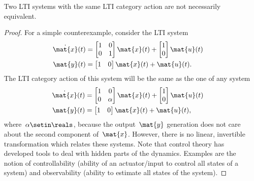 \begin{remark}
    Two LTI systems with the same LTI category action are not necessarily equivalent.
\end{remark}
\begin{proof}
    For a simple counterexample, consider the LTI system
    \begin{equation}
        \begin{aligned}
            \dot{\mat{x}}(t) & =\begin{bmatrix}
                                    1 & 0 \\ 0& 1
                                \end{bmatrix} \mat{x}(t)+\begin{bmatrix}
                                                             1 \\ 0
                                                         \end{bmatrix} \mat{u}(t) \\
            \mat{y}(t)       & =\begin{bmatrix}
                                    1 & 0
                                \end{bmatrix} \mat{x}(t)+\mat{u}(t).
        \end{aligned}
    \end{equation}
    The LTI category action of this system will be the same as the one of any system
    \begin{equation}
        \begin{aligned}
            \dot{\mat{x}}(t) & =\begin{bmatrix}
                                    1 & 0 \\ 0& \alpha
                                \end{bmatrix} \mat{x}(t)+\begin{bmatrix}
                                                             1 \\ 0
                                                         \end{bmatrix} \mat{u}(t) \\
            \mat{y}(t)       & =\begin{bmatrix}
                                    1 & 0
                                \end{bmatrix} \mat{x}(t)+\mat{u}(t),
        \end{aligned}
    \end{equation}
    where~$\alpha \setin \reals$, because the output~$\mat{y}$ generation does not care about the second component of~$\mat{x}$.
    However, there is no linear, invertible transformation which relates these systems.
    Note that control theory has developed tools to deal with hidden parts of the dynamics.
    Examples are the notion of controllability (ability of an actuator/input to control all states of a system) and observability (ability to estimate all states of the system).
\end{proof}

